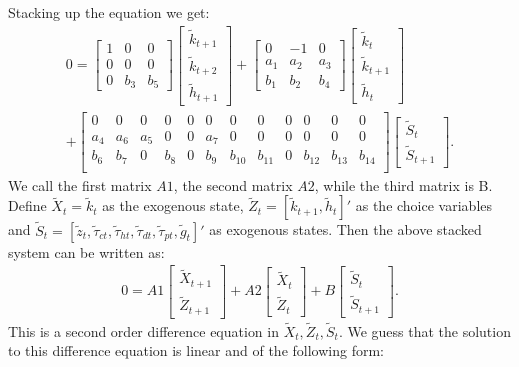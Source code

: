 \documentclass[12pt]{article}
\begin{document}
Stacking up the equation we get: 
\begin{multline*}
0 = \begin{bmatrix} 1 & 0 & 0 \\ 0 & 0 & 0 \\ 0 & b_3 & b_5 \end{bmatrix} \begin{bmatrix} \tilde{k}_{t+1} \\ \tilde{k}_{t+2} \\ \tilde{h}_{t+1} \end{bmatrix} + \begin{bmatrix} 0 & -1 & 0 \\ a_1 & a_2 & a_3 \\ b_1 & b_2 & b_4 \end{bmatrix} \begin{bmatrix} \tilde{k}_{t} \\ \tilde{k}_{t+1} \\ \tilde{h}_{t} \end{bmatrix} \\
+ \begin{bmatrix}
	0 & 0 & 0 & 0 & 0 & 0 & 0 & 0 & 0 & 0 & 0 & 0\\
	a_4 & a_6 & a_5 & 0 & 0 & a_7 & 0 & 0 & 0 & 0 & 0 & 0\\
	b_6 & b_7 & 0 & b_8 & 0 & b_9 & b_{10} & b_{11} & 0 & b_{12} & b_{13} & b_{14}\\
\end{bmatrix} 
\begin{bmatrix}
\tilde{S}_t \\
\tilde{S}_{t+1}
\end{bmatrix}.
\end{multline*}
We call the first matrix $A1$, the second matrix $A2$, while the third matrix is B. Define $\tilde{X}_t  =  \tilde{k}_t$ as the exogenous state, $\tilde{Z}_t = [\tilde{k}_{t+1},  \tilde{h}_t]'$ as the choice variables and $\tilde{S}_t = [\tilde{z}_t, \tilde{\tau}_{ct}, \tilde{\tau}_{ht}, \tilde{\tau}_{dt}, \tilde{\tau}_{pt}, \tilde{g}_t]'$ as exogenous states. Then the above stacked system can be written as:
\begin{align*}
0 = A1 \begin{bmatrix} \tilde{X}_{t+1} \\ \tilde{Z}_{t+1} \end{bmatrix} + A2 \begin{bmatrix} \tilde{X}_t \\ \tilde{Z}_t \end{bmatrix} + B \begin{bmatrix} \tilde{S}_t  \\ \tilde{S}_{t+1}  \end{bmatrix}.
\end{align*}
This is a second order difference equation in $\tilde{X}_t, \tilde{Z}_t, \tilde{S}_t$. We guess that the solution to this difference equation is linear and of the following form:
\end{document}
